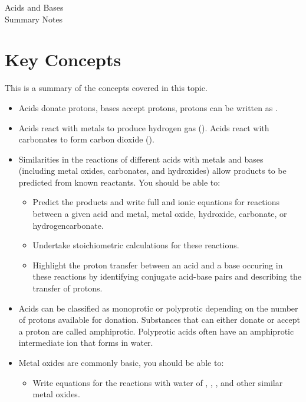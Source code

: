 \documentclass{article}
\begin{document}


\begin{center}
{\Huge Acids and Bases} \\[6pt]
{\Large Summary Notes}
\end{center}

\section*{Key Concepts}

This is a summary of the concepts covered in this topic.

\begin{itemize}
  \item Acids donate protons, bases accept protons, protons can be written as .
  
  \item Acids react with metals to produce hydrogen gas (). Acids react with carbonates to form carbon dioxide ().
  
  \item Similarities in the reactions of different acids with metals and bases (including metal oxides, carbonates, and hydroxides) allow products to be predicted from known reactants. You should be able to:
    \begin{itemize}
      \item Predict the products and write
full and ionic equations for reactions
between a given acid and
metal, metal oxide, hydroxide, carbonate, or
hydrogencarbonate.
      \item Undertake stoichiometric calculations for these
reactions.
      \item Highlight the proton transfer between an acid and a base occuring in these reactions by identifying conjugate acid-base pairs and describing the transfer of protons.
    \end{itemize}

  \item Acids can be classified as monoprotic or
polyprotic depending on the number of
protons available for donation. Substances that can either donate or accept a proton are called amphiprotic. Polyprotic acids often have an amphiprotic intermediate ion that forms in water.

  \item Metal oxides are commonly basic, you should be able to:
    \begin{itemize}
      \item Write equations for the reactions with
water of , , , and other similar metal oxides.
    \end{itemize}


\end{itemize}
\end{document}
